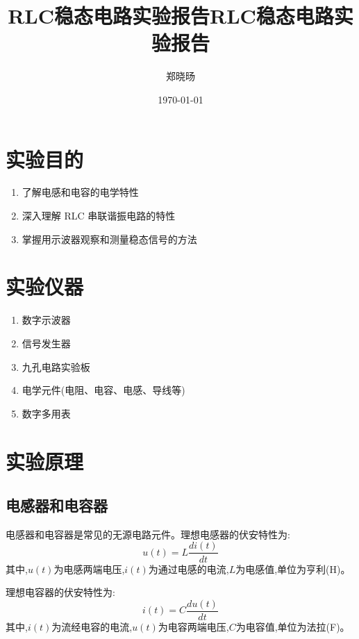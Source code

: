 \documentclass[UTF8]{ctexart}
\title{RLC稳态电路实验报告}
\title{RLC稳态电路实验报告}
\author{郑晓旸}
\date{\today}
\begin{document}
\fancyfoot[C]{\thepage}

\maketitle
\tableofcontents
\newpage

\section{实验目的}
    \begin{enumerate}
            \item 了解电感和电容的电学特性 
            \item 深入理解 RLC 串联谐振电路的特性
            \item 掌握用示波器观察和测量稳态信号的方法
    \end{enumerate} 



\section{实验仪器}
\begin{enumerate}
    \item 数字示波器
    \item 信号发生器
    \item 九孔电路实验板
    \item 电学元件(电阻、电容、电感、导线等)
    \item 数字多用表
\end{enumerate}


\section{实验原理}

\subsection{电感器和电容器}

电感器和电容器是常见的无源电路元件。理想电感器的伏安特性为:
\begin{equation}
u(t) = L\frac{di(t)}{dt}
\end{equation}
其中,$u(t)$为电感两端电压,$i(t)$为通过电感的电流,$L$为电感值,单位为亨利(H)。

理想电容器的伏安特性为:
\begin{equation}
i(t) = C\frac{du(t)}{dt}
\end{equation}
其中,$i(t)$为流经电容的电流,$u(t)$为电容两端电压,$C$为电容值,单位为法拉(F)。
\end{document}
